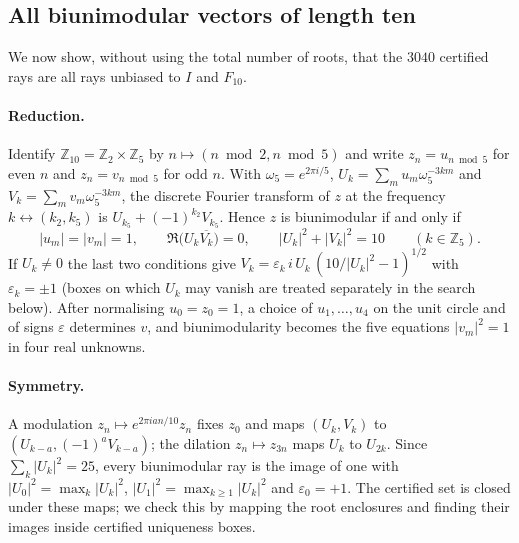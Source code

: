 \documentclass[11pt]{article}
\theoremstyle{definition}
\theoremstyle{remark}
\newcommand{\Z}{\mathbb{Z}}
\begin{document}
\subsection{All biunimodular vectors of length ten}\label{sec:complete}
We now show, without using the total number of roots, that the $3040$ certified rays are all rays unbiased to $I$ and $F_{10}$.

\paragraph{Reduction.} Identify $\Z_{10}=\Z_2\times\Z_5$ by $n\mapsto(n\bmod2,n\bmod5)$ and write $z_n=u_{n\bmod5}$ for
even $n$ and $z_n=v_{n\bmod5}$ for odd $n$. With $\omega_5=e^{2\pi i/5}$, $U_k=\sum_mu_m\omega_5^{-3km}$ and
$V_k=\sum_mv_m\omega_5^{-3km}$, the discrete Fourier transform of $z$ at the frequency $k\leftrightarrow(k_2,k_5)$ is
$U_{k_5}+(-1)^{k_2}V_{k_5}$. Hence $z$ is biunimodular if and only if
\begin{equation}\label{eq:crt}
|u_m|=|v_m|=1,\qquad \Re\bigl(U_k\overline{V_k}\bigr)=0,\qquad |U_k|^2+|V_k|^2=10\qquad(k\in\Z_5).
\end{equation}
If $U_k\neq0$ the last two conditions give $V_k=\varepsilon_k\,i\,U_k\,(10/|U_k|^2-1)^{1/2}$ with $\varepsilon_k=\pm1$
(boxes on which $U_k$ may vanish are treated separately in the search below).
After normalising $u_0=z_0=1$, a choice of $u_1,\dots,u_4$ on the unit circle and of signs $\varepsilon$ determines
$v$, and biunimodularity becomes the five equations $|v_m|^2=1$ in four real unknowns.

\paragraph{Symmetry.} A modulation $z_n\mapsto e^{2\pi ian/10}z_n$ fixes $z_0$ and maps $(U_k,V_k)$ to
$(U_{k-a},(-1)^aV_{k-a})$; the dilation $z_n\mapsto z_{3n}$ maps $U_k$ to $U_{2k}$. Since $\sum_k|U_k|^2=25$, every
biunimodular ray is the image of one with $|U_0|^2=\max_k|U_k|^2$, $|U_1|^2=\max_{k\ge1}|U_k|^2$ and $\varepsilon_0=+1$.
The certified set is closed under these maps; we check this by mapping the root enclosures and finding their images
inside certified uniqueness boxes.
\end{document}
